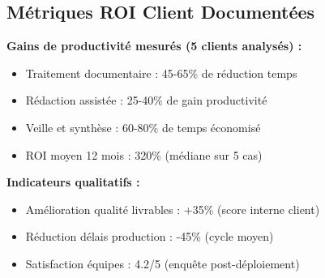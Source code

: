 \subsection{Métriques ROI Client Documentées}

\textbf{Gains de productivité mesurés (5 clients analysés) :}
\begin{itemize}
    \item Traitement documentaire : 45-65\% de réduction temps
    \item Rédaction assistée : 25-40\% de gain productivité
    \item Veille et synthèse : 60-80\% de temps économisé
    \item ROI moyen 12 mois : 320\% (médiane sur 5 cas)
\end{itemize}

\textbf{Indicateurs qualitatifs :}
\begin{itemize}
    \item Amélioration qualité livrables : +35\% (score interne client)
    \item Réduction délais production : -45\% (cycle moyen)
    \item Satisfaction équipes : 4.2/5 (enquête post-déploiement)
\end{itemize}
